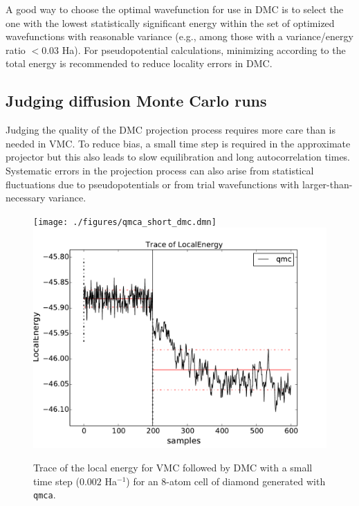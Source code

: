 A good way to choose the optimal wavefunction for use in DMC is to select 
the one with the lowest statistically significant energy within the set of 
optimized wavefunctions with reasonable variance (e.g., among 
those with a variance/energy ratio $<0.03$ Ha).  For pseudopotential 
calculations, minimizing according to the total energy is recommended 
to reduce locality errors in DMC.


\subsection{Judging diffusion Monte Carlo runs}
\label{sec:qmca_judge_dmc}
Judging the quality of the DMC projection process requires more 
care than is needed in VMC. To reduce bias, a small 
time step is required in the approximate projector but this also 
leads to slow equilibration and long autocorrelation times.  
Systematic errors in the projection process can also arise from 
statistical fluctuations due to pseudopotentials or from trial 
wavefunctions with larger-than-necessary variance.

\begin{figure}
\begin{center}
  \ifdefined\HCode  
\texttt{[image: ./figures/qmca\_short\_dmc.dmn]}
\else
\includegraphics[trim = 0mm 0mm 0mm 0mm,clip,width=0.75\columnwidth]{./figures/qmca_short_dmc.pdf}
\fi
\end{center}
\caption{Trace of the local energy for VMC followed by DMC with a small time step ($0.002$ Ha$^{-1}$) for an 8-atom cell of diamond generated with \texttt{qmca}.}
\label{fig:qmca_short_dmc}
\end{figure}

